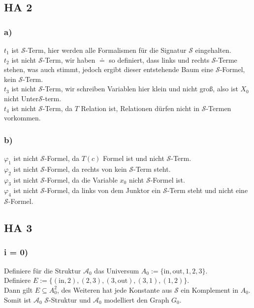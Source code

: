 \documentclass[12pt, a4paper]{article}
\begin{document}
\subsection*{HA 2}
\subsubsection*{a)}
\(t_1\) ist \(\mathcal S\)-Term, hier werden alle Formalismen für die Signatur \(\mathcal S\) eingehalten. \\
\(t_2\) ist nicht \(\mathcal S\)-Term, wir haben \(\doteq\) so definiert, dass links und rechts \(\mathcal S\)-Terme stehen, was auch stimmt, jedoch ergibt dieser entstehende Baum eine \(\mathcal S\)-Formel, kein \(\mathcal S\)-Term. \\
\(t_3\) ist nicht \(\mathcal S\)-Term, wir schreiben Variablen hier klein und nicht groß, also ist \(X_0\) nicht Unter\(\mathcal S\)-term. \\
\(t_4\) ist nicht \(\mathcal S\)-Term, da \(T\) Relation ist, Relationen dürfen nicht in \(\mathcal S\)-Termen vorkommen.
\subsubsection*{b)}
\(\varphi_1\) ist nicht \(\mathcal S\)-Formel, da \(T(c)\) Formel ist und nicht \(\mathcal S\)-Term. \\
\(\varphi_2\) ist nicht \(\mathcal S\)-Formel, da rechts von \textquote{\(\doteq\)} kein \(\mathcal S\)-Term steht. \\
\(\varphi_3\) ist nicht \(\mathcal S\)-Formel, da die Variable \(x_0\) nicht \(\mathcal S\)-Formel ist. \\
\(\varphi_4\) ist nicht \(\mathcal S\)-Formel, da links von dem Junktor \textquote{\(\wedge\)} ein \(\mathcal S\)-Term steht und nicht eine \(\mathcal S\)-Formel.
\subsection*{HA 3}
\subsubsection*{i = 0)}
Definiere für die Struktur \(\mathcal A_0\) das Universum \(A_0 := \{\text{in}, \text{out}, 1, 2, 3\}\). \\
Definiere \(E := \{(\text{in}, 2), (2, 3), (3, \text{out}), (3,1), (1,2)\}\). \\
Dann gilt \(E \subseteq A_0^2\), des Weiteren hat jede Konstante aus \(\mathcal S\) ein Komplement in \(A_0\).\\
Somit ist \(\mathcal A_0\) \(\mathcal S\)-Struktur und \(\mathcal A_0\) modelliert den Graph \(G_0\).
\end{document}
